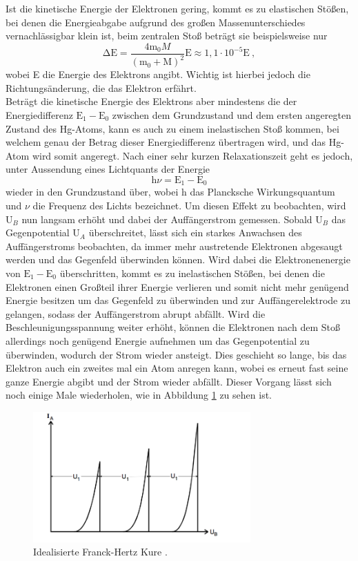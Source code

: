 Ist die kinetische Energie der Elektronen gering, kommt es zu elastischen Stößen, bei
denen die Energieabgabe aufgrund des großen Massenunterschiedes vernachlässigbar klein ist,
beim zentralen Stoß beträgt sie beispielsweise nur
\begin{equation*}
  \increment \text{E} = \frac{4\text{m}_0 M}{(\text{m}_0 + \text{M})^2}\text{E} \approx 1,1 \cdot 10^{-5} \text{E} \:,
\end{equation*}
wobei E die Energie des Elektrons angibt.
Wichtig ist hierbei jedoch die Richtungsänderung, die das Elektron erfährt.\\
Beträgt die kinetische Energie des Elektrons aber mindestens die der Energiedifferenz $ \text{E}_1 - \text{E}_0$
zwischen dem Grundzustand und dem ersten angeregten Zustand des Hg-Atoms, kann es auch zu einem
inelastischen Stoß kommen, bei welchem genau der Betrag dieser Energiedifferenz übertragen wird,
und das Hg-Atom wird somit angeregt. Nach einer sehr kurzen Relaxationszeit geht es jedoch, unter
Aussendung eines Lichtquants der Energie
\begin{equation}
  \text{h}\nu = \text{E}_1 - \text{E}_0
  \label{eqn:quant}
\end{equation}
wieder in den Grundzustand über, wobei h das Plancksche Wirkungsquantum und $\nu$ die Frequenz des
Lichts bezeichnet.
Um diesen Effekt zu beobachten, wird $\text{U}_B$ nun langsam erhöht und dabei der Auffängerstrom gemessen.
Sobald $\text{U}_B$ das Gegenpotential $\text{U}_A$ überschreitet, lässt sich ein
starkes Anwachsen des Auffängerstroms beobachten, da immer mehr austretende Elektronen
abgesaugt werden und das Gegenfeld überwinden können. Wird dabei die Elektronenenergie
von $\text{E}_1 - \text{E}_0$ überschritten, kommt es zu inelastischen Stößen, bei denen
die Elektronen einen Großteil ihrer Energie verlieren und somit nicht mehr genügend
Energie besitzen um das Gegenfeld zu überwinden und zur Auffängerelektrode zu gelangen, sodass
der Auffängerstrom abrupt abfällt.
Wird die Beschleunigungsspannung weiter erhöht, können die Elektronen nach dem Stoß allerdings
noch genügend Energie aufnehmen um das Gegenpotential zu überwinden, wodurch der Strom wieder ansteigt.
Dies geschieht so lange, bis das Elektron auch ein zweites mal ein Atom anregen kann, wobei
es erneut fast seine ganze Energie abgibt und der Strom wieder abfällt. Dieser Vorgang lässt sich
noch einige Male wiederholen, wie in Abbildung \ref{fig:kurve} zu sehen ist.
\begin{figure}[H]
  \centering
  \includegraphics[height=5cm]{Kurve.png}
  \caption{Idealisierte Franck-Hertz Kure \cite{skript}.}
  \label{fig:kurve}
\end{figure}
